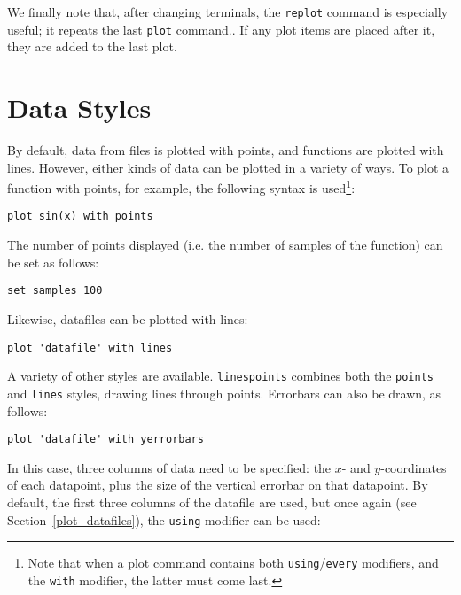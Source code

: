 \documentclass[a4paper,onecolumn,11pt]{book}
\begin{document}
We finally note that, after changing terminals, the \texttt{replot} command is
especially useful; it repeats the last \texttt{plot} command.. If any plot items are placed after it, they
are added to the last plot.

\section{Data Styles}

By default, data from files is plotted with points, and functions are plotted
with lines. However, either kinds of data can be plotted in a variety of ways.
To plot a function with points, for example, the following syntax is
used\footnote{Note that when a plot command contains both
\texttt{using}/\texttt{every} modifiers, and the \texttt{with} modifier, the
latter must come last.}:

\begin{verbatim}
plot sin(x) with points
\end{verbatim}

\noindent The number of points displayed (i.e. the number of samples of the
function) can be set as follows:

\begin{verbatim}
set samples 100
\end{verbatim}

Likewise, datafiles can be plotted with lines:

\begin{verbatim}
plot 'datafile' with lines
\end{verbatim}

A variety of other styles are available. \texttt{linespoints} combines both the
\texttt{points} and \texttt{lines} styles, drawing lines through points.
Errorbars can also be drawn, as follows:

\begin{verbatim}
plot 'datafile' with yerrorbars
\end{verbatim}

\noindent In this case, three columns of data need to be specified: the $x$-
and $y$-coordinates of each datapoint, plus the size of the vertical errorbar
on that datapoint. By default, the first three columns of the datafile are
used, but once again (see Section~\ref{plot_datafiles}), the \texttt{using}
modifier can be used:
\end{document}
